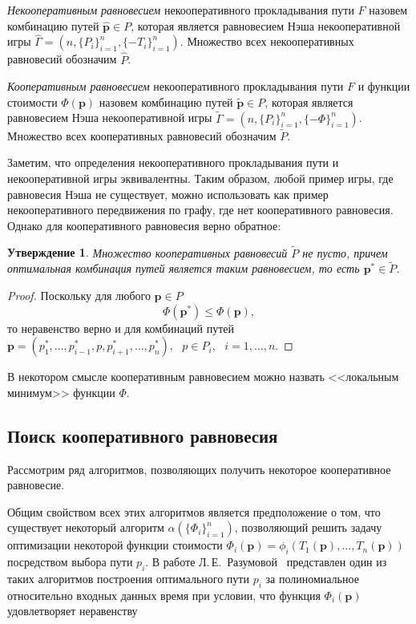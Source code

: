 \documentclass[12pt, a4paper]{article}
\newtheorem{state}{Утверждение}[section]
\begin{document}
\textit{Некооперативным равновесием} некооперативного прокладывания пути $F$ назовем комбинацию путей $\widehat{\textbf{p}} \in P$, которая является равновесием Нэша некооперативной игры $\widehat{\Gamma} = (n, \{P_i\}_{i = 1}^n, \{-T_i\}_{i = 1}^n)$. Множество всех некооперативных равновесий обозначим $\widehat{P}$.

\textit{Кооперативным равновесием} некооперативного прокладывания пути $F$ и функции стоимости $\Phi (\textbf{p})$ назовем комбинацию путей $\widetilde{\textbf{p}} \in P$, которая является равновесием Нэша некооперативной игры $\widetilde{\Gamma} = (n, \{P_i\}_{i = 1}^n, \{-\Phi\}_{i = 1}^n)$. Множество всех кооперативных равновесий обозначим $\widetilde{P}$.

Заметим, что определения некооперативного прокладывания пути и некооперативной игры эквивалентны.  
Таким образом, любой пример игры, где равновесия Нэша не существует, можно использовать как пример некооперативного передвижения по графу, где нет кооперативного равновесия.
Однако для кооперативного равновесия верно обратное:

\begin{state}
Множество кооперативных равновесий $\widetilde{P}$ не пусто, причем
оптимальная комбинация путей является таким равновесием, то есть $\textbf{p}^* \in \widetilde{P}$.
\end{state}

\begin{proof}
	Поскольку для любого $\textbf{p} \in P$ 
	$$\Phi (\textbf{p}^*) \le \Phi (\textbf{p}),$$
	то неравенство верно и для комбинаций путей $\textbf{p} = \left(p^*_1, \ldots, p^*_{i - 1}, p, p^*_{i + 1}, \ldots, p^*_{n} \right), \text{ } p \in P_i, \text{ } i = 1, \ldots, n$.
\end{proof}

В некотором смысле кооперативным равновесием можно назвать <<локальным минимум>> функции $\Phi$.

\subsection{Поиск кооперативного равновесия}
Рассмотрим ряд алгоритмов, позволяющих получить некоторое кооперативное равновесие.

Общим свойством всех этих алгоритмов является предположение о том, что существует некоторый алгоритм $\alpha (\{\Phi_i\}_{i = 1}^n)$, позволяющий решить задачу оптимизации некоторой функции стоимости $\Phi_i (\textbf{p}) = \phi_i(T_1(\textbf{p}), \ldots, T_n(\textbf{p}))$ посредством выбора пути $p_i$. В работе Л.\,Е.~Разумовой~\cite{Luba} представлен один из таких алгоритмов построения оптимального пути $p_i$ за полиномиальное относительно входных данных время при условии, что функция $\Phi_i (\textbf{p})$ удовлетворяет неравенству
\end{document}
